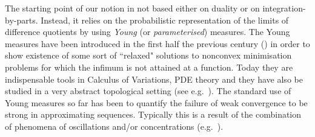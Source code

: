\documentclass{amsart}
\theoremstyle{definition}
\numberwithin{equation}{section}
\begin{document}
The starting point of our notion in not based either on duality or on integration-by-parts. Instead, it relies on the probabilistic representation of the limits of difference quotients by using \emph{Young} (or \emph{parameterised}) measures. The Young measures have been introduced in the first half the previous century (\cite{Y}) in order to show existence of some sort of ``relaxed" solutions to nonconvex minimisation problems for which the infimum is not  attained at a function. Today they are indispensable tools in Calculus of Variations, PDE theory and they have also be studied in a very abstract topological setting (see e.g.\ \cite{E, M, P, FL, CFV, FG, V}). The standard use of Young measures so far has been to quantify the failure of weak convergence to be strong in approximating sequences. Typically this is a result of the combination of phenomena of oscillations and/or concentrations (e.g.\ \cite{DPM, KR}).
\end{document}
